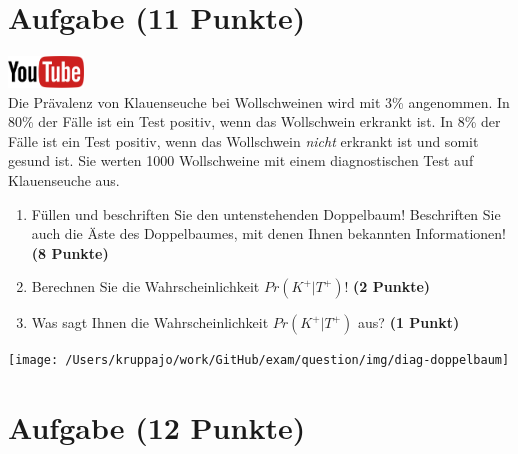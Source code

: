 \documentclass[a4paper, 9pt]{scrartcl}\usepackage[]{graphicx}\usepackage[]{xcolor}
\begin{document}
\clearpage

\section{Aufgabe \hfill (11 Punkte)}

\hfill\href{https://youtu.be/VQlNl8hvRII}{\includegraphics[width =
  2cm]{img/youtube}}\\[1Ex]


Die Pr{\"a}valenz von Klauenseuche bei Wollschweinen wird mit
3\% angenommen. In 80\% der F{\"a}lle ist ein Test positiv, wenn das Wollschwein erkrankt
ist. In 8\% der F{\"a}lle ist ein Test positiv,
wenn das Wollschwein \textit{nicht} erkrankt ist und somit gesund ist. Sie
werten 1000 Wollschweine mit einem
diagnostischen Test auf Klauenseuche aus.



\begin{enumerate}
\item F{\"u}llen und beschriften Sie den untenstehenden Doppelbaum! Beschriften
  Sie auch die {\"A}ste des Doppelbaumes, mit denen Ihnen bekannten
  Informationen!  \textbf{(8 Punkte)}
\item Berechnen Sie die Wahrscheinlichkeit $Pr(K^+|T^+)$! \textbf{(2 Punkte)}
\item Was sagt Ihnen die Wahrscheinlichkeit $Pr(K^+|T^+)$ aus? \textbf{(1 Punkt)}
\end{enumerate}

\vspace{1cm}

\begin{center}
  \texttt{[image: /Users/kruppajo/work/GitHub/exam/question/img/diag-doppelbaum]}
\end{center}



 
\clearpage

\section{Aufgabe \hfill (12 Punkte)}
\end{document}
